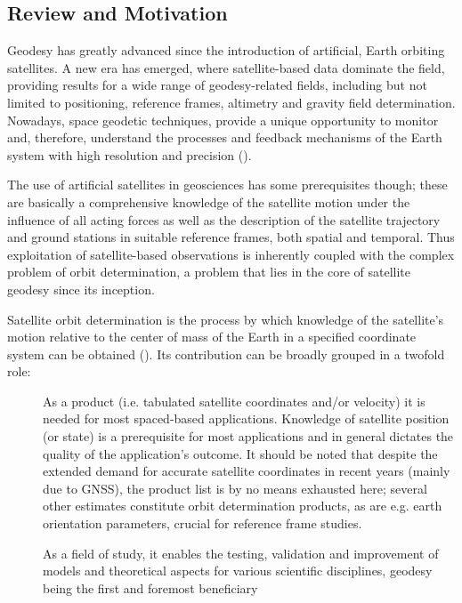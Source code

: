 \subsection{Review and Motivation}\label{ssec:review-and-motvation}

Geodesy has greatly advanced since the introduction of artificial, Earth orbiting 
satellites. A new era has emerged, where satellite-based data dominate the field, 
providing results for a wide range of geodesy-related fields, including but not 
limited to positioning, reference frames, altimetry and gravity field determination. 
Nowadays, space geodetic techniques, provide a unique opportunity to monitor and, 
therefore, understand the processes and feedback mechanisms of the Earth 
system with high resolution and precision (\cite{Jin2013}).

The use of artificial satellites in geosciences has some prerequisites though; 
these are basically a comprehensive knowledge of the satellite motion under 
the influence of all acting forces as well as the description of the satellite
trajectory and ground stations in suitable reference frames, both spatial and 
temporal. Thus exploitation of satellite-based observations is inherently 
coupled with the complex problem of orbit determination, a problem that lies in 
the core of satellite geodesy since its inception.

Satellite orbit determination is the process by which knowledge of the satellite’s
motion relative to the center of mass of the Earth in a specified coordinate 
system can be obtained (\cite{Tapley2004}). Its contribution can be broadly
grouped in a twofold role:
\begin{description}
    \item[] As a product (i.e. tabulated satellite coordinates and/or velocity) 
    it is needed for most spaced-based applications. Knowledge of satellite 
    position (or state) is a prerequisite for most applications and in general 
    dictates the quality of the application's outcome. It should be noted that 
    despite the extended demand for accurate satellite coordinates in recent 
    years (mainly due to GNSS), the product list is by no means exhausted here; 
    several other estimates constitute orbit determination products, as are e.g. 
    earth orientation parameters, crucial for reference frame studies.
    \item[] As a field of study, it enables the testing, validation and improvement 
    of models and theoretical aspects for various scientific disciplines, 
    geodesy being the first and foremost beneficiary
\end{description}

